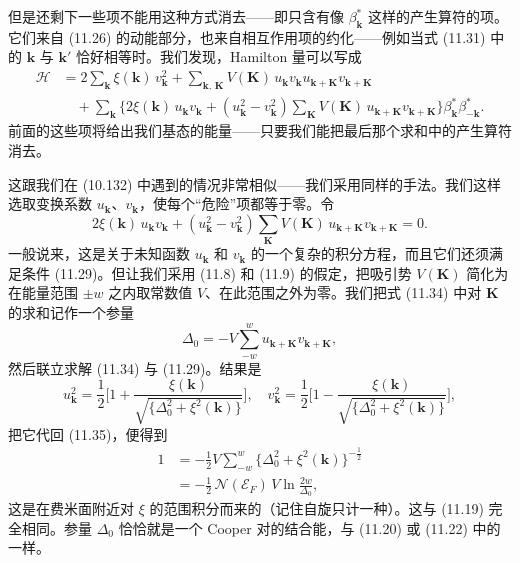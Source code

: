 但是还剩下一些项不能用这种方式消去——即只含有像 $\beta^{*}_{\mathbf{k}}$ 这样的产生算符的项。它们来自 (11.26) 的动能部分，也来自相互作用项的约化——例如当式 (11.31) 中的 $\mathbf{k}$ 与 $\mathbf{k}'$ 恰好相等时。我们发现，Hamilton 量可以写成
\begin{align*}
\mathcal{H}&=2\sum_{\mathbf{k}}\xi(\mathbf{k})\,v^{2}_{\mathbf{k}}+\sum_{\mathbf{k},\,\mathbf{K}}V(\mathbf{K})\,u_{\mathbf{k}}v_{\mathbf{k}}u_{\mathbf{k}+\mathbf{K}}v_{\mathbf{k}+\mathbf{K}}\\
&\quad+\sum_{\mathbf{k}}\bigl\{2\xi(\mathbf{k})\,u_{\mathbf{k}}v_{\mathbf{k}}+(u^{2}_{\mathbf{k}}-v^{2}_{\mathbf{k}})\sum_{\mathbf{K}}V(\mathbf{K})\,u_{\mathbf{k}+\mathbf{K}}v_{\mathbf{k}+\mathbf{K}}\bigr\}\beta^{*}_{\mathbf{k}}\beta^{*}_{-\mathbf{k}}.
\tag{11.33}
\end{align*}
前面的这些项将给出我们基态的能量——只要我们能把最后那个求和中的产生算符消去。

这跟我们在 (10.132) 中遇到的情况非常相似——我们采用同样的手法。我们这样选取变换系数 $u_{\mathbf{k}}$、$v_{\mathbf{k}}$，使每个“危险”项都等于零。令
\begin{equation*}
2\xi(\mathbf{k})\,u_{\mathbf{k}}v_{\mathbf{k}}+(u^{2}_{\mathbf{k}}-v^{2}_{\mathbf{k}})\sum_{\mathbf{K}}V(\mathbf{K})\,u_{\mathbf{k}+\mathbf{K}}v_{\mathbf{k}+\mathbf{K}}=0.
\tag{11.34}
\end{equation*}
一般说来，这是关于未知函数 $u_{\mathbf{k}}$ 和 $v_{\mathbf{k}}$ 的一个复杂的积分方程，而且它们还须满足条件 (11.29)。但让我们采用 (11.8) 和 (11.9) 的假定，把吸引势 $V(\mathbf{K})$ 简化为在能量范围 $\pm w$ 之内取常数值 $V$、在此范围之外为零。我们把式 (11.34) 中对 $\mathbf{K}$ 的求和记作一个参量
\begin{equation*}
\Delta_{0}=-V\sum_{-w}^{w}u_{\mathbf{k}+\mathbf{K}}v_{\mathbf{k}+\mathbf{K}},
\tag{11.35}
\end{equation*}
然后联立求解 (11.34) 与 (11.29)。结果是
\begin{equation*}
u^{2}_{\mathbf{k}}=\frac{1}{2}\biggl[1+\frac{\xi(\mathbf{k})}{\sqrt{\{\Delta^{2}_{0}+\xi^{2}(\mathbf{k})\}}}\biggr],\quad v^{2}_{\mathbf{k}}=\frac{1}{2}\biggl[1-\frac{\xi(\mathbf{k})}{\sqrt{\{\Delta^{2}_{0}+\xi^{2}(\mathbf{k})\}}}\biggr],
\tag{11.36}
\end{equation*}
把它代回 (11.35)，便得到
\begin{align*}
1&=-\frac{1}{2}V\sum_{-w}^{w}\{\Delta^{2}_{0}+\xi^{2}(\mathbf{k})\}^{-\frac{1}{2}}\\
&=-\frac{1}{2}\,\mathcal{N}(\mathcal{E}_{F})\,V\ln\frac{2w}{\Delta_{0}},
\tag{11.37}
\end{align*}
这是在费米面附近对 $\xi$ 的范围积分而来的（记住自旋只计一种）。这与 (11.19) 完全相同。参量 $\Delta_{0}$ 恰恰就是一个 Cooper 对的结合能，与 (11.20) 或 (11.22) 中的一样。

